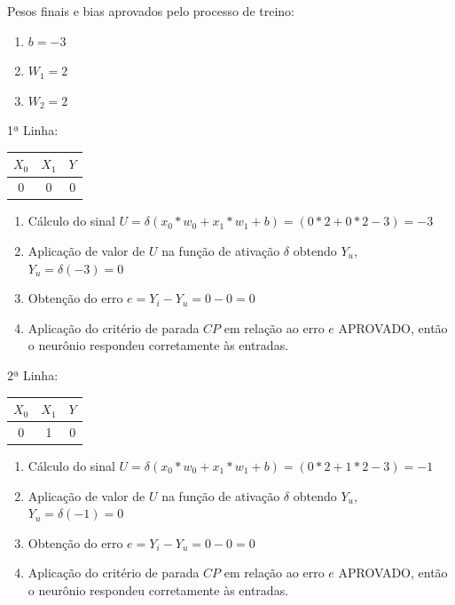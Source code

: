 \documentclass[	12pt, Times, openright, twoside, a4paper, english, brazil]{abntex2}
\begin{document}
            	Pesos finais e bias aprovados pelo processo de treino:
            	\begin{enumerate}
            		\item $b=  -3$  					
            		\item $W_1= 2$ 
            		\item $W_2= 2$
            	\end{enumerate}
            	
            	1ª Linha:
            	\begin{tabular}{|c|c|c|}
            		\hline  \textbf{$X_0$} & \textbf{$X_1$} &  \textbf{$Y$}\\
            		\hline 0 & 0 & 0\\
            	\end{tabular}
            	\begin{enumerate}
            		\item Cálculo do sinal $U = \delta(x_0*w_0 + x_1*w_1 +b) = (0*2 + 0*2 -3) = -3$
            		\item Aplicação de valor de $U$ na função de ativação $\delta$ obtendo $Y_u$, $Y_u = \delta(-3) = 0$
            		\item Obtenção do erro $e = Y_i-Y_u = 0 - 0 = 0$
            		\item Aplicação do critério de parada $CP$ em relação ao erro $e$ APROVADO, então o neurônio respondeu corretamente às entradas.
            	\end{enumerate}
            	
            	2ª Linha:
            	\begin{tabular}{|c|c|c|}
            		\hline  \textbf{$X_0$} & \textbf{$X_1$} &  \textbf{$Y$}\\
            		\hline 0 & 1 & 0\\
            	\end{tabular}
            	\begin{enumerate}
            		\item Cálculo do sinal $U = \delta(x_0*w_0 + x_1*w_1 +b) = (0*2 + 1*2 -3) = -1$
            		\item Aplicação de valor de $U$ na função de ativação $\delta$ obtendo $Y_u$, $Y_u = \delta(-1) = 0$
            		\item Obtenção do erro $e = Y_i-Y_u = 0 - 0 = 0$
            		\item Aplicação do critério de parada $CP$ em relação ao erro $e$ APROVADO, então o neurônio respondeu corretamente às entradas.
            	\end{enumerate}
            
\end{document}
